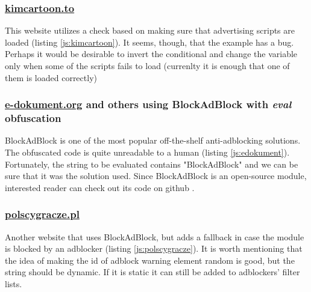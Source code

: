 
                       
\subsubsection{\url{kimcartoon.to}}
This website utilizes a check based on making sure that advertising scripts
are loaded (listing \ref{js:kimcartoon}). It seems, though, that the example has a bug.
Perhaps it would be desirable to invert the conditional and change the variable
only when some of the scripts fails to load (currenlty it is enough that one of them is loaded correctly)


                       
\subsubsection{\url{e-dokument.org} and others using BlockAdBlock with \emph{eval} obfuscation}
BlockAdBlock is one of the most popular off-the-shelf anti-adblocking solutions.
The obfuscated code is quite unreadable to a human (listing \ref{js:edokument}).
Fortunately, the string to be evaluated contains "BlockAdBlock" and we can be sure that it was
the solution used. Since BlockAdBlock is an open-source module, interested reader can check 
out its code on github \cite{github:blockadblock}.



\subsubsection{\url{polscygracze.pl}}
Another website that uses BlockAdBlock, but adds a fallback in case the module is blocked
by an adblocker (listing \ref{js:polscygracze}). It is worth mentioning that the idea of 
making the id of adblock warning element random is good, but the string should be dynamic. 
If it is static it can still be added to adblockers' filter lists.
                       


